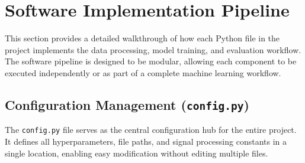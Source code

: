\section{Software Implementation Pipeline}\label{implementation_pipeline}

This section provides a detailed walkthrough of how each Python file in the project implements the data processing, 
model training, and evaluation workflow. The software pipeline is designed to be modular, allowing each component 
to be executed independently or as part of a complete machine learning workflow.

\subsection{Configuration Management (\texttt{config.py})}

The \texttt{config.py} file serves as the central configuration hub for the entire project. It defines all 
hyperparameters, file paths, and signal processing constants in a single location, enabling easy modification 
without editing multiple files.

